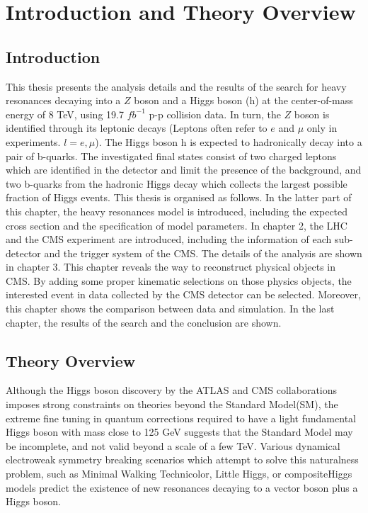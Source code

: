 \chapter{Introduction and Theory Overview}

\section{Introduction}
This thesis presents the analysis details and the results of the search for heavy resonances decaying into a $Z$ boson and a Higgs boson (h) at the center-of-mass energy of 8 TeV, using 19.7 $fb^{-1}$ p-p collision data. In turn, the $Z$ boson is identified through its leptonic decays (Leptons often refer to $e$ and $\mu$ only in experiments. $l = e, \mu$). The Higgs boson h is expected to hadronically decay into a pair of b-quarks. The investigated final states consist of two charged leptons which are identified in the detector and limit the presence of the background, and two b-quarks from the hadronic Higgs decay which collects the largest possible fraction of Higgs events.
\newline This thesis is organised as follows. In the latter part of this chapter, the heavy resonances model is introduced, including the expected cross section and the specification of model parameters. In chapter 2, the LHC and the CMS experiment are introduced, including the information of each sub-detector and the trigger system of the CMS. The details of the analysis are shown in chapter 3. This chapter reveals the way to reconstruct physical objects in CMS. By adding some proper kinematic selections on those physics objects, the interested event in data collected by the CMS detector can be selected. Moreover, this chapter shows the comparison between data and simulation. In the last chapter, the results of the search and the conclusion are shown.

\section{Theory Overview}
Although the Higgs boson discovery by the ATLAS and CMS collaborations\cite{atlas-higgs-1,cms-higgs-1,cms-higgs-2} imposes strong constraints on theories beyond the Standard Model(SM), the extreme fine tuning in quantum corrections required to have a light fundamental Higgs boson with mass close to 125 GeV\cite{cms-higgs-3,atlas-higgs-2,atlas-higgs-3,atlas-cms-higgs} suggests that the Standard Model may be incomplete, and not valid beyond a scale of a few TeV. Various dynamical electroweak symmetry breaking scenarios which attempt to solve this naturalness problem, such as Minimal Walking Technicolor\cite{technicolor}, Little Higgs\cite{little-higgs-1,little-higgs-2,little-higgs-3}, or compositeHiggs models\cite{compositehiggs-1,compositehiggs-2,compositehiggs-3} predict the existence of new resonances decaying to a vector boson plus a Higgs boson.

